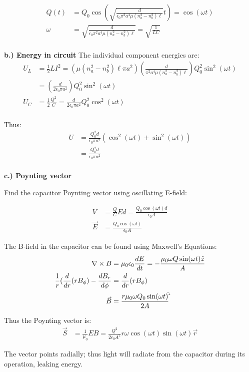 \documentclass[10pt]{article} %
\begin{document}
\begin{align*}
  Q(t) &= Q_0\cos(\sqrt{\frac{d}{\epsilon_0\pi^2 a^4\mu\left(n_a^2-n_b^2\right)\ell}}t) = \cos(\omega t)\\
  \omega &= \sqrt{\frac{d}{\epsilon_0\pi^2 a^4\mu\left(n_a^2-n_b^2\right)\ell}} = \sqrt{\frac{1}{LC}}\\
\end{align*}

\textbf{b.) Energy in circuit}
The individual component energies are:\\

\begin{align*}
  U_L &= \frac{1}{2}LI^2 = \left(\mu(n_a^2-n_b^2)\ell\pi a^2\right)\left(\frac{d}{\pi^2 a^4\mu\left(n_a^2-n_b^2\right)\ell}\right)Q_0^2\sin^2(\omega t)\\
  &= \left(\frac{d}{2\epsilon_0\pi a^2}\right)Q_0^2\sin^2(\omega t)\\
  U_C &= \frac{1}{2}\frac{Q^2}{C} = \frac{d}{2\epsilon_0 \pi a^2}Q_0^2\cos^2(\omega t)\\
\end{align*}

Thus:\\

\begin{align*}
  U &= \frac{Q_0^2d}{\epsilon_0 \pi a^2}(\cos^2(\omega t)+\sin^2(\omega t))\\
  &= \frac{Q_0^2d}{\epsilon_0 \pi a^2}\\
\end{align*}

\textbf{c.) Poynting vector}

Find the capacitor Poynting vector using oscillating E-field:

\begin{align*}
  V &= \frac{Q}{C}Ed = \frac{Q_0\cos(\omega t)d}{\epsilon_0 A}\\
  \vec{E} &= \frac{Q_0\cos(\omega t)}{\epsilon_0 A}
\end{align*}

The B-field in the capacitor can be found using Maxwell's Equations:\\

\begin{align*}
  \nabla \times B &= \mu_0\epsilon_0 \frac{dE}{dt} = -\frac{\mu_0\omega Q\sin(\omega t)\hat{z}}{A}\\
  \frac{1}{r}(\frac{d}{dr}(rB_\phi)-\frac{dB_r}{d\phi} &= \frac{d}{dr}(rB_\phi)\\
  \vec{B} &= \frac{r\mu_0\omega Q_0 \sin(\omega t)\hat{\vec}}{2A}\\
\end{align*}

Thus the Poynting vector is:\\

\begin{align*}
  \vec{S} &= \frac{1}{\mu_0}EB = \frac{Q^2}{2\epsilon_0A^2}r\omega \cos(\omega t)\sin(\omega t)\vec{r}
\end{align*}

The vector points radially; thus light will radiate from the capacitor during its operation, leaking energy.\\
\end{document}
